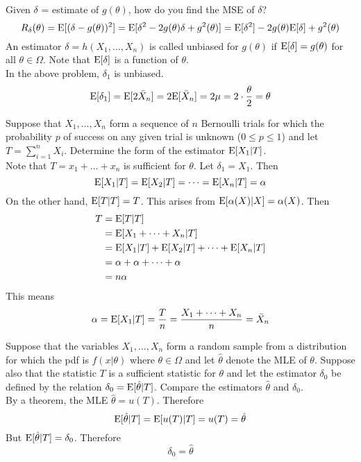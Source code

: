 \documentclass[12pt]{article}
\begin{document}
Given $\delta$ = estimate of $g(\theta)$, how do you find the MSE of $\delta$? 
$$R_\delta(\theta) = \mathrm{E}[ (\delta - g(\theta))^2 ] = \mathrm{E}[ \delta^2 - 2g(\theta)\delta + g^2(\theta) ] = \mathrm{E}[ \delta^2 ] - 2g(\theta)\mathrm{E}[ \delta ] + g^2(\theta) $$ 
An estimator $\delta = h(X_1,\dots,X_n)$ is called unbiased for $g(\theta)$ if $\mathrm{E}[ \delta ] = g(\theta)$ for all $\theta \in \Omega$. Note that $\mathrm{E}[ \delta ]$ is a function of $\theta$. \\
In the above problem, $\delta_1$ is unbiased. 
$$ \mathrm{E}[ \delta_1 ] = \mathrm{E}[ 2\bar{X}_n ] = 2\mathrm{E}[ \bar{X}_n ] = 2\mu = 2 \cdot \frac{\theta}{2} = \theta $$ 

Suppose that $X_1,\dots,X_n$ form a sequence of $n$ Bernoulli trials for which the probability $p$ of success on any given trial is unknown ($0 \leq p \leq 1$) and let $T = \sum_{i=1}^n X_i$. Determine the form of the estimator $\mathrm{E}[ X_1 | T ]$. \\
Note that $T = x_1 + \dots + x_n$ is sufficient for $\theta$. Let $\delta_1 = X_1$. Then 
$$\mathrm{E}[ X_1 | T ] = \mathrm{E}[ X_2 | T ] = \dots = \mathrm{E}[ X_n | T  ] = \alpha $$ 
On the other hand, $\mathrm{E}[ T | T ] = T$. This arises from $\mathrm{E}[ \alpha(X) | X ] = \alpha(X)$. Then $$ \begin{aligned} T &= \mathrm{E}[ T | T ] \\ &= \mathrm{E}[ X_1 + \dots + X_n | T ] \\ &= \mathrm{E}[ X_1 | T ] + \mathrm{E}[ X_2 | T ] + \dots + \mathrm{E}[ X_n | T ] \\ &= \alpha + \alpha + \dots + \alpha \\ &= n\alpha \end{aligned} $$ 
This means $$ \alpha = \mathrm{E}[ X_1 | T ] = \frac{T}{n} = \frac{X_1 + \dots + X_n}{n} = \bar{X}_n $$ 

Suppose that the variables $X_1,\dots,X_n$ form a random sample from a distribution for which the pdf is $f(x|\theta)$ where $ \theta \in \Omega$ and let $\hat{\theta}$ denote the MLE of $\theta$. Suppose also that the statistic $T$ is a sufficient statistic for $\theta$ and let the estimator $\delta_0$ be defined by the relation $\delta_0 = \mathrm{E}[ \hat{\theta} | T ]$. Compare the estimators $\hat{\theta}$ and $\delta_0$. \\ 
By a theorem, the MLE $\hat{\theta} = u(T)$. Therefore 
$$\mathrm{E}[ \hat{\theta} | T ] = \mathrm{E}[ u(T) | T ] = u(T) = \hat{\theta} $$ 
But $\mathrm{E}[ \hat{\theta} | T ] = \delta_0$. Therefore $$\delta_0 = \hat{\theta} $$ 
\end{document}
